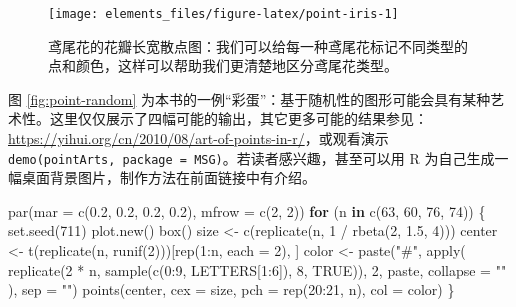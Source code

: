 \documentclass[
  b5paper,
  UTF8,twoside]{book}
\newenvironment{Shaded}{\begin{snugshade}}{\end{snugshade}}
\newcommand{\AttributeTok}[1]{\textcolor[rgb]{0.77,0.63,0.00}{#1}}
\newcommand{\ConstantTok}[1]{\textcolor[rgb]{0.00,0.00,0.00}{#1}}
\newcommand{\ControlFlowTok}[1]{\textcolor[rgb]{0.13,0.29,0.53}{\textbf{#1}}}
\newcommand{\DecValTok}[1]{\textcolor[rgb]{0.00,0.00,0.81}{#1}}
\newcommand{\FloatTok}[1]{\textcolor[rgb]{0.00,0.00,0.81}{#1}}
\newcommand{\FunctionTok}[1]{\textcolor[rgb]{0.00,0.00,0.00}{#1}}
\newcommand{\NormalTok}[1]{#1}
\newcommand{\OtherTok}[1]{\textcolor[rgb]{0.56,0.35,0.01}{#1}}
\newcommand{\SpecialCharTok}[1]{\textcolor[rgb]{0.00,0.00,0.00}{#1}}
\newcommand{\StringTok}[1]{\textcolor[rgb]{0.31,0.60,0.02}{#1}}
\begin{document}
\begin{figure}

{\centering \texttt{[image: elements\_files/figure-latex/point-iris-1]} 

}

\caption[鸢尾花的花瓣长宽散点图 ]{鸢尾花的花瓣长宽散点图：我们可以给每一种鸢尾花标记不同类型的点和颜色，这样可以帮助我们更清楚地区分鸢尾花类型。}\label{fig:point-iris}
\end{figure}

图 \ref{fig:point-random} 为本书的一例``彩蛋''：基于随机性的图形可能会具有某种艺术性。这里仅仅展示了四幅可能的输出，其它更多可能的结果参见：\url{https://yihui.org/cn/2010/08/art-of-points-in-r/}，或观看演示 \texttt{demo(\textquotesingle{}pointArts\textquotesingle{},\ package\ =\ \textquotesingle{}MSG\textquotesingle{})}。若读者感兴趣，甚至可以用 R 为自己生成一幅桌面背景图片，制作方法在前面链接中有介绍。

\begin{Shaded}
\begin{Highlighting}[]
\FunctionTok{par}\NormalTok{(}\AttributeTok{mar =} \FunctionTok{c}\NormalTok{(}\FloatTok{0.2}\NormalTok{, }\FloatTok{0.2}\NormalTok{, }\FloatTok{0.2}\NormalTok{, }\FloatTok{0.2}\NormalTok{), }\AttributeTok{mfrow =} \FunctionTok{c}\NormalTok{(}\DecValTok{2}\NormalTok{, }\DecValTok{2}\NormalTok{))}
\ControlFlowTok{for}\NormalTok{ (n }\ControlFlowTok{in} \FunctionTok{c}\NormalTok{(}\DecValTok{63}\NormalTok{, }\DecValTok{60}\NormalTok{, }\DecValTok{76}\NormalTok{, }\DecValTok{74}\NormalTok{)) \{}
  \FunctionTok{set.seed}\NormalTok{(}\DecValTok{711}\NormalTok{)}
  \FunctionTok{plot.new}\NormalTok{()}
  \FunctionTok{box}\NormalTok{()}
\NormalTok{  size }\OtherTok{\textless{}{-}} \FunctionTok{c}\NormalTok{(}\FunctionTok{replicate}\NormalTok{(n, }\DecValTok{1} \SpecialCharTok{/} \FunctionTok{rbeta}\NormalTok{(}\DecValTok{2}\NormalTok{, }\FloatTok{1.5}\NormalTok{, }\DecValTok{4}\NormalTok{)))}
\NormalTok{  center }\OtherTok{\textless{}{-}} \FunctionTok{t}\NormalTok{(}\FunctionTok{replicate}\NormalTok{(n, }\FunctionTok{runif}\NormalTok{(}\DecValTok{2}\NormalTok{)))[}\FunctionTok{rep}\NormalTok{(}\DecValTok{1}\SpecialCharTok{:}\NormalTok{n, }\AttributeTok{each =} \DecValTok{2}\NormalTok{), ]}
\NormalTok{  color }\OtherTok{\textless{}{-}} \FunctionTok{paste}\NormalTok{(}\StringTok{"\#"}\NormalTok{, }\FunctionTok{apply}\NormalTok{(}
    \FunctionTok{replicate}\NormalTok{(}\DecValTok{2} \SpecialCharTok{*}\NormalTok{ n, }\FunctionTok{sample}\NormalTok{(}\FunctionTok{c}\NormalTok{(}\DecValTok{0}\SpecialCharTok{:}\DecValTok{9}\NormalTok{, LETTERS[}\DecValTok{1}\SpecialCharTok{:}\DecValTok{6}\NormalTok{]), }\DecValTok{8}\NormalTok{, }\ConstantTok{TRUE}\NormalTok{)), }\DecValTok{2}\NormalTok{, paste,}
    \AttributeTok{collapse =} \StringTok{""}
\NormalTok{  ), }\AttributeTok{sep =} \StringTok{""}\NormalTok{)}
  \FunctionTok{points}\NormalTok{(center, }\AttributeTok{cex =}\NormalTok{ size, }\AttributeTok{pch =} \FunctionTok{rep}\NormalTok{(}\DecValTok{20}\SpecialCharTok{:}\DecValTok{21}\NormalTok{, n), }\AttributeTok{col =}\NormalTok{ color)}
\NormalTok{\}}
\end{Highlighting}
\end{Shaded}
\end{document}
